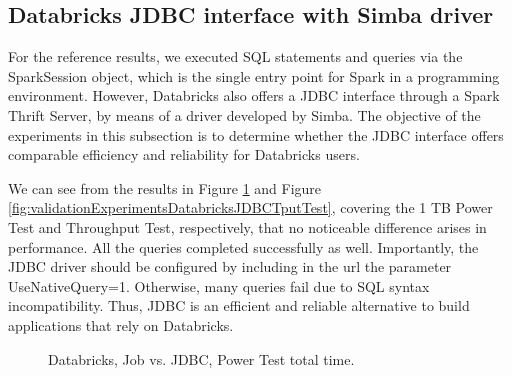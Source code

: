 \subsection{Databricks JDBC interface with Simba driver}\label{databricksJDBC}

For the reference results, we executed SQL statements and queries via the SparkSession object, which is the single entry point for Spark in a programming environment. However, Databricks also offers a JDBC interface through a Spark Thrift Server, by means of a driver developed by Simba. The objective of the experiments in this subsection is to determine whether the JDBC interface offers comparable efficiency and reliability for Databricks users.

We can see from the results in Figure \ref{fig:validationExperimentsDatabricksJDBCPowerTest} and Figure \ref{fig:validationExperimentsDatabricksJDBCTputTest}, covering the 1 TB Power Test and Throughput Test, respectively, that no noticeable difference arises in performance. All the queries completed successfully as well. Importantly, the JDBC driver should be configured by including in the url the parameter UseNativeQuery=1. Otherwise, many queries fail due to SQL syntax incompatibility. Thus, JDBC is an efficient and reliable alternative to build applications that rely on Databricks.

\begin{figure}
   \begin{center}
   \end{center}
   \caption{Databricks, Job vs. JDBC, Power Test total time.}
   \label{fig:validationExperimentsDatabricksJDBCPowerTest}
\end{figure}

